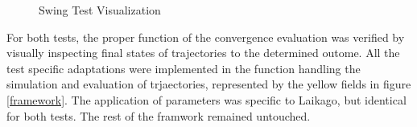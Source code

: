 \begin{figure}[h!]
    \caption{Swing Test Visualization}
    \label{fig:droplkg}
    
\end{figure}


    For both tests, the proper function of the convergence evaluation was verified by visually inspecting final states of trajectories to the determined outome. All the test specific adaptations were implemented in the function handling the simulation and evaluation of trjaectories, represented by the yellow fields in figure \ref{framework}. The application of parameters was specific to Laikago, but identical for both tests. The rest of the framwork remained untouched.








    


    
    


